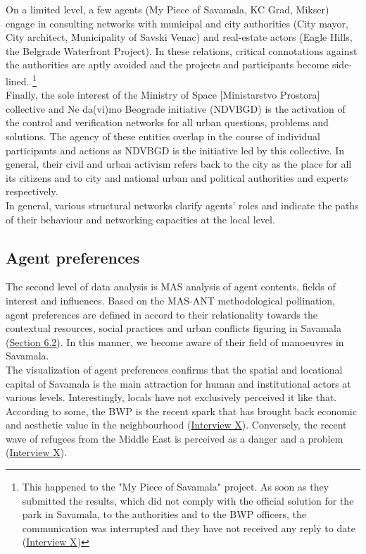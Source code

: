 \documentclass[11pt]{report}
\begin{document}
{{{{On a limited level, a few agents (My Piece of Savamala, KC Grad, Mikser) engage in consulting networks with municipal and city authorities (City mayor, City architect, Municipality of Savski Venac) and real-estate actors (Eagle Hills, the Belgrade Waterfront Project). In these relations, critical connotations against the authorities are aptly avoided and the projects and participants become side-lined. 
\footnote{This happened to the "My Piece of Savamala" project.  As soon as they submitted the results, which did not comply with the official solution for the park in Savamala, to the authorities and to the BWP officers, the communication was interrupted and they have not received any reply to date
(\href{InterviewX}{Interview X})}
\\

Finally, the sole interest of  the  Ministry of Space [Ministarstvo Prostora] collective and Ne da(vi)mo Beograde initiative (NDVBGD) is the activation of the control and verification networks for all urban questions, problems and solutions. The agency of these entities overlap in the course of individual participants and actions as NDVBGD is the initiative led by this collective.
In general, their civil and urban activism refers back to the city as the place for all its citizens and to city and national urban and political authorities and experts respectively.
\\

In general, various structural networks clarify agents’ roles and indicate the paths of their behaviour and networking capacities at the local level.

\subsection{Agent preferences}

The second level of data analysis is MAS analysis of agent contents, fields of interest and influences.
Based on the MAS-ANT methodological pollination, agent preferences are defined in accord to their relationality towards the contextual resources, social practices and urban conflicts figuring in Savamala (\href{Section 6.2}{Section 6.2}).
In this manner, we become aware of their field of manoeuvres in Savamala. 
\\

The visualization of agent preferences confirms that the spatial and locational capital of Savamala is the main attraction for human and institutional actors at various levels.
Interestingly, locals have not exclusively perceived it like that.
According to some, the BWP is the recent spark that has brought back economic and aesthetic value in the neighbourhood
(\href{InterviewX}{Interview X}).
Conversely, the recent wave of refugees from the Middle East is perceived as a danger and a problem 
(\href{InterviewX}{Interview X}).
\\

}}}}
\end{document}
